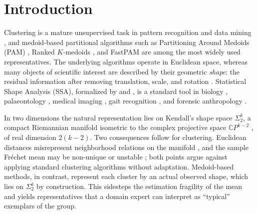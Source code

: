 \documentclass[review,11pt,3p,authoryear]{elsarticle}
\newcommand{\CP}{\mathbb{C}P}
\begin{document}
\section{Introduction}
\label{sec:intro}

Clustering is a mature unsupervised task in pattern recognition and data
mining \citep{xu2005survey,jain2010data,everitt2011cluster}, and
medoid-based partitional algorithms such as Partitioning Around Medoids
(PAM) \citep{rousseeuw1990finding,ng2002clarans}, Ranked $K$-medoids
\citep{zadegan2013ranked}, and FastPAM \citep{schubert2019faster} are
among the most widely used representatives. The underlying algorithms
operate in Euclidean space, whereas many objects of scientific interest
are described by their geometric \emph{shape}: the residual information
after removing translation, scale, and rotation
\citep{kendall1977diffusion}. Statistical Shape Analysis (SSA), formalized
by \citet{kendall1984shape} and \citet{bookstein1986size}, is a standard
tool in biology \citep{adams2004character,collyer2015method}, palaeontology
\citep{bookstein1986size}, medical imaging
\citep{durrleman2014morphometry,hu2021covertheface}, gait recognition
\citep{wang2003automatic}, and forensic anthropology
\citep{schlager2013soft}.

In two dimensions the natural representation lies on Kendall's shape space
$\Sigma_2^k$, a compact Riemannian manifold isometric to the complex
projective space $\CP^{k-2}$ \citep{kendall1984shape,small2012statistical,
le1993riemannian}, of real dimension $2(k-2)$. Two consequences follow
for clustering. Euclidean distances misrepresent neighborhood relations
on the manifold \citep{eltzner2021stability}, and the sample Fr\'{e}chet
mean may be non-unique or unstable
\citep{bhattacharya2012nonparametric,eltzner2021stability}; both points
argue against applying standard clustering algorithms without adaptation.
Medoid-based methods, in contrast, represent each cluster by an actual
observed shape, which lies on $\Sigma_2^k$ by construction. This
sidesteps the estimation fragility of the mean and yields
representatives that a domain expert can interpret as ``typical''
exemplars of the group.
\end{document}
